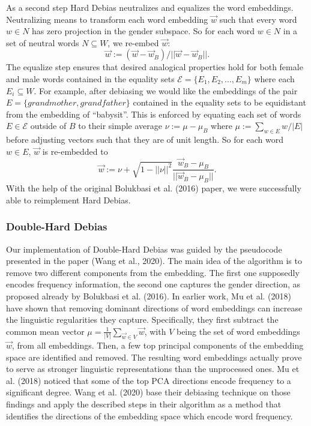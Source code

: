 \documentclass[
  english,
  man,floatsintext]{apa6}
\begin{document}
As a second step Hard Debias neutralizes and equalizes the word embeddings. Neutralizing means to transform each word embedding \(\vec{w}\) such that every word \(w\in N\) has zero projection in the gender subspace. So for each word \(w\in N\) in a set of neutral words \(N \subseteq W\), we re-embed \(\vec{w}\): \[\vec{w}:=(\vec{w}-\vec{w}_B)/||\vec{w}-\vec{w}_B||.\] The equalize step ensures that desired analogical properties hold for both female and male words contained in the equality sets \(\mathcal{E}=\{E_1,E_2,...,E_m\}\) where each \(E_i \subseteq W\). For example, after debiasing we would like the embeddings of the pair \(E=\{grandmother, grandfather\}\) contained in the equality sets to be equidistant from the embedding of \enquote{babysit}. This is enforced by equating each set of words \(E\in \mathcal{E}\) outside of \(B\) to their simple average \(\nu:=\mu-\mu_B\) where \(\mu:=\sum_{w\in E}w/|E|\) before adjusting vectors such that they are of unit length. So for each word \(w\in E\), \(\vec{w}\) is re-embedded to \[\vec{w}:=\nu+\sqrt{1-||\nu||^2}\frac{\vec{w}_B-\mu_B}{||\vec{w}_B-\mu_B||}.\]
With the help of the original Bolukbasi et al. (2016) paper, we were successfully able to reimplement Hard Debias.

\hypertarget{double-hard-debias}{%
\subsubsection{Double-Hard Debias}\label{double-hard-debias}}

Our implementation of Double-Hard Debias was guided by the pseudocode presented in the paper (Wang et al., 2020).
The main idea of the algorithm is to remove two different components from the embedding. The first one supposedly encodes frequency information, the second one captures the gender direction, as proposed already by Bolukbasi et al. (2016).
In earlier work, Mu et al. (2018) have shown that removing dominant directions of word embeddings can increase the linguistic regularities they capture. Specifically, they first subtract the common mean vector \(\mu = \frac{1}{|V|}\sum_{\vec{w} \in V}\vec{w}\), with \(V\) being the set of word embeddings \(\vec{w}\), from all embeddings. Then, a few top principal components of the embedding space are identified and removed. The resulting word embeddings actually prove to serve as stronger linguistic representations than the unprocessed ones. Mu et al. (2018) noticed that some of the top PCA directions encode frequency to a significant degree. Wang et al. (2020) base their debiasing technique on those findings and apply the described steps in their algorithm as a method that identifies the directions of the embedding space which encode word frequency.
\end{document}
